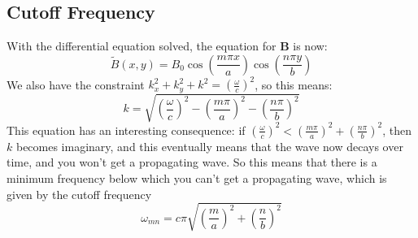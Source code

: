 \subsection{Cutoff Frequency}
With the differential equation solved, the equation for \( \mathbf{B} \) is now: 
\[
	\tilde B(x, y) = B_0 \cos\left( \frac{m \pi x}{a} \right) \cos\left( \frac{n \pi y}{b} \right)
\]
We also have the constraint \( k_x^2 + k_y^2 + k^2 = \left( \frac{\omega}{c} \right)^2 \), so this means:
\[
	k = \sqrt{\left( \frac{\omega}{c} \right)^2 - \left( \frac{m\pi}{a} \right)^2 - \left( \frac{n\pi}{b}
	\right)^2}
\]
This equation has an interesting consequence: if \( \left( \frac{\omega}{c} \right)^2 < \left( \frac{m\pi}{a}
\right)^2 + \left( \frac{n\pi}{b} \right)^2 \), then \( k \) becomes imaginary, and this eventually means
that the wave now decays over time, and you won't get a propagating wave. So this means that there is a
minimum frequency below which you can't get a propagating wave, which is given by the cutoff frequency
\[
	\omega_{mn} = c \pi \sqrt{\left( \frac{m}{a} \right)^2 + \left( \frac{n}{b} \right)^2}
\]
